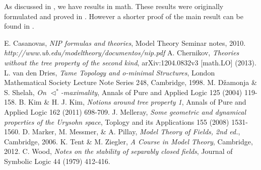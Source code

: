 \documentclass[12pt]{article}
\begin{document}
 

As discussed in \cite{DzSh}, we have results in math. These results were originally formulated and proved in \cite{Ch}. However a shorter proof of the main result can be found in \cite[Theorem 3.4]{Wo}.

\begin{thebibliography}{9}
%
E. Casanovas,
{\emph{NIP formulas and theories}},
Model Theory Seminar notes, 2010.\\\textit{http://www.ub.edu/modeltheory/documentos/nip.pdf}
%
A. Chernikov,
{\emph{Theories without the tree property of the second kind}},
arXiv:1204.0832v3 [math.LO] (2013).
%
L. van den Dries,
{\emph{Tame Topology and o-minimal Structures}},
London Mathematical Society Lecture Note Series 248, Cambridge, 1998.
%
M. D\v{z}amonja \& S. Shelah,
{\emph{On $\lhd^*$-maximality}},
Annals of Pure and Applied Logic 125 (2004) 119-158.
%
B. Kim \& H. J. Kim,
{\emph{Notions around tree property 1}},
Annals of Pure and Applied Logic 162 (2011) 698-709.
%
J. Melleray,
{\emph{Some geometric and dynamical properties of the Urysohn space}},
Toplogy and its Applications 155 (2008)  1531-1560.
%
D. Marker, M. Messmer, \& A. Pillay,
{\emph{Model Theory of Fields, 2nd ed.}},
Cambridge, 2006.
%
K. Tent \& M. Ziegler,
{\emph{A Course in Model Theory}},
Cambridge, 2012.
%
C. Wood,
{\emph{Notes on the stability of separably closed fields}},
Journal of Symbolic Logic 44 (1979) 412-416.
%
\end{thebibliography}
\end{document}
